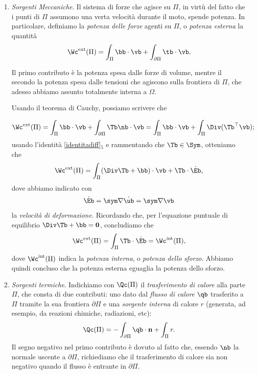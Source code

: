 \begin{enumerate}
	\item \textit{Sorgenti Meccaniche}. Il sistema di forze  che agisce su $\Pi$, in virtù del fatto che i punti di $\Pi$ assumono una verta velocità durante il moto, spende potenza. In particolare, definiamo la \textit{potenza delle forze} agenti su $\Pi$, o \textit{potenza esterna} la quantità
	\begin{equation}\label{Wext}
		\Wc^{\rm ext}(\Pi)= \int_{\Pi} \bb \cdot \vb + \int_{\partial \Pi} \tb\cdot \vb.
	\end{equation}

Il primo contributo è la potenza spesa dalle forze di volume, mentre il secondo la potenza spesa dalle tensioni che agiscono sulla frontiera di $\Pi$, che adesso abbiamo assunto totalmente interna a $\Omega$.

Usando il teorema di Cauchy, possiamo scrivere che 
	
\begin{equation}
		\Wc^{\rm ext}(\Pi)=	\int_{\Pi} \bb \cdot \vb + \int_{\partial \Pi} \Tb \nb\cdot \vb = \int_{\Pi} \bb \cdot \vb + \int_{\Pi} \Div(\Tb^\top\vb);
	\end{equation}
usando l'identità \eqref{identitadiff}$_5$ e rammentando che $\Tb\in\Sym$, otteniamo che 
\begin{equation}
		\Wc^{\rm ext}(\Pi)	= \int_{\Pi} (\Div\Tb+\bb) \cdot \vb +  \Tb \cdot \dot{\Eb},
\end{equation}
dove abbiamo indicato con
\begin{equation}
\dot\Eb=\sym \nabla \dot \ub=\sym \nabla \vb
\end{equation}
la \textit{velocità di deformazione}. Ricordando che, per l'equazione puntuale di equilibrio $\Div\Tb+\bb=\mathbf{0}$, concludiamo che
\begin{equation}
	\Wc^{\rm ext}(\Pi)= \int_{\Pi}  \Tb \cdot \dot{\Eb}=	\Wc^{\rm int}(\Pi),
\end{equation}
dove $\Wc^{\rm int}(\Pi)$ indica la \textit{potenza interna}, o \textit{potenza dello sforzo}. Abbiamo quindi concluso che la potenza esterna eguaglia la potenza dello sforzo.

\item \textit{Sorgenti termiche}. Indichiamo con $\Qc(\Pi)$ il\textit{ trasferimento di calore} alla parte $\Pi$, che consta di due contributi: uno dato dal \textit{flusso di calore} $\qb$ trasferito a $\Pi$ tramite la sua frontiera $\partial\Pi$ e una \textit{sorgente interna} di calore $r$ (generata, ad esempio, da reazioni chimiche, radiazioni, etc):
\begin{equation}
	\Qc(\Pi) = -\int_{\partial \Pi} \qb\cdot \mathbf{n} + \int_{\Pi} r.
\end{equation}
Il segno negativo nel primo contributo è dovuto al fatto che, essendo $\nb$ la normale uscente a $\partial\Pi$, richiediamo che il trasferimento di calore sia non negativo quando il flusso è entrante in $\partial\Pi$. 


\end{enumerate}
